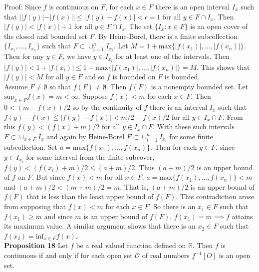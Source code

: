 \documentclass[a4paper]{article}
\begin{document}
Proof: Since $f$ is continuous on $F$, for each $x \in F$ there is an open interval $I_x$ such that $||f(y)| - |f(x)|| \leq |f(y) - f(x)| < \epsilon =1$ for all $y \in F\cap I_x$. Then $|f(y)| < |f(x)| + 1$ for all $y \in F\cap I_x$. The set $\{I_x : x \in F\}$ is an open cover of the closed and bounded set $F$. By Heine-Borel, there is a finite subcollection $\{I_{x_1},...,I_{x_n}\}$ such that $F \subset \cup_{i=1}^n I_{x_i}$. Let $M = 1+\text{max}\{|f(x_1)|,...,|f(x_n)|\}$. Then for any $y \in F$, we have $y \in I_{x_i}$ for at least one of the intervals. Then $|f(y)| < 1+|f(x_i)| \leq 1+\text{max}\{|f(x_1)|,...,|f(x_n)|\} = M$. This shows that $|f(y)| < M$ for all $y \in F$ and so $f$ is bounded on $F$ is bounded. \\

Assume $F \neq \emptyset$ so that $f(F) \neq \emptyset$. Then $f(F)$ is a nonempty bounded set. Let $\text{sup}_{x \in F} f(x) = m < \infty$. Suppose $f(x) < m$ for each $x \in F$. Then $0< (m-f(x))/2$ so by the continuity of $f$ there is an interval $I_x$ such that $f(y) - f(x) \leq |f(y)-f(x)| < m/2 - f(x)/2$ for all $y \in I_x \cap F$. From this $f(y) < (f(x) + m)/2$ for all $y \in I_x \cap F$. With these such intervals $F \subset \cup_{x \in F} I_x$ and again by Heine-Borel $F \subset \cup_{i=1}^n I_{x_i}$ for some finite subcollection. Set $a = \text{max}\{f(x_1),...,f(x_n)\}$. Then for each $y \in F$, since $y \in I_{x_i}$ for some interval from the finite subcover, $f(y) < (f(x_i) + m)/2 \leq (a+m)/2$. Thus $(a+m)/2$ is an upper bound of $f$ on $F$. But since $f(x) < m$ for all $x \in F$, $a = \text{max}\{f(x_1),...,f(x_n)\} < m$ and $(a+m)/2 < (m+m)/2 = m$. That is, $(a+m)/2$ is an upper bound of $f(F)$ that is less than the least upper bound of $f(F)$. This contradiction arose from supposing that $f(x) < m$ for each $x \in F$. So there is an $x_1 \in F$ such that $f(x_1) \geq m$ and since $m$ is an upper bound of $f(F)$, $f(x_1) = m \implies f$ attains its maximum value. A similar argument shows that there is an $x_2 \in F$ such that $f(x_2) = \text{inf}_{x \in F} f(x)$.  \\

{\bf Proposition 18} Let $f$ be a real valued function defined on $\mathbb{R}$. Then $f$ is continuous if and only if for each open set $\mathcal{O}$ of real numbers $f^{-1}[O]$ is an open set. \\
\end{document}
